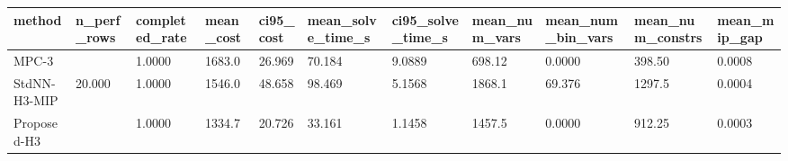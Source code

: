 \begin{tabular}{lllllllllll}
\toprule
method & n\_perf\_rows & completed\_rate & mean\_cost & ci95\_cost & mean\_solve\_time\_s & ci95\_solve\_time\_s & mean\_num\_vars & mean\_num\_bin\_vars & mean\_num\_constrs & mean\_mip\_gap \\
\midrule
MPC-3 &  & 1.0000 & 1683.0 & 26.969 & 70.184 & 9.0889 & 698.12 & 0.0000 & 398.50 & 0.0008 \\
StdNN-H3-MIP & 20.000 & 1.0000 & 1546.0 & 48.658 & 98.469 & 5.1568 & 1868.1 & 69.376 & 1297.5 & 0.0004 \\
Proposed-H3 &  & 1.0000 & 1334.7 & 20.726 & 33.161 & 1.1458 & 1457.5 & 0.0000 & 912.25 & 0.0003 \\
\bottomrule
\end{tabular}
